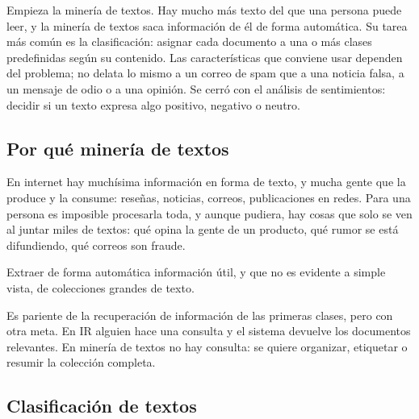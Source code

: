 \documentclass[11pt,letterpaper]{article}
\begin{document}
\newpage


\begin{quick_sum}
    Empieza la minería de textos. Hay mucho más texto del que una
    persona puede leer, y la minería de textos saca información de él
    de forma automática. Su tarea más común es la clasificación:
    asignar cada documento a una o más clases predefinidas según su
    contenido. Las características que conviene usar dependen del
    problema; no delata lo mismo a un correo de spam que a una noticia
    falsa, a un mensaje de odio o a una opinión. Se cerró con el
    análisis de sentimientos: decidir si un texto expresa algo
    positivo, negativo o neutro.
\end{quick_sum}

\subsection*{Por qué minería de textos}

En internet hay muchísima información en forma de texto, y mucha gente
que la produce y la consume: reseñas, noticias, correos, publicaciones
en redes. Para una persona es imposible procesarla toda, y aunque
pudiera, hay cosas que solo se ven al juntar miles de textos: qué
opina la gente de un producto, qué rumor se está difundiendo, qué
correos son fraude.

\begin{definicion}
    Extraer de forma automática información útil, y que no es evidente
    a simple vista, de colecciones grandes de texto.
\end{definicion}

Es pariente de la recuperación de información de las primeras clases,
pero con otra meta. En IR alguien hace una consulta y el sistema
devuelve los documentos relevantes. En minería de textos no hay
consulta: se quiere organizar, etiquetar o resumir la colección
completa.


\subsection*{Clasificación de textos}
\end{document}
